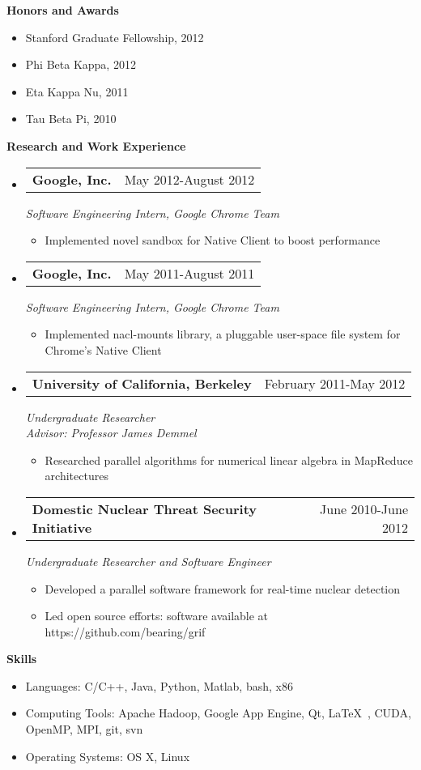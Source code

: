 \documentclass[letterpaper,11pt]{article}
\makeatletter
\newcommand{\resitem}[1]{\item #1 \vspace{-2pt}}
\newcommand{\desitem}[1]{\item #1 \vspace{-7pt}}
\newcommand{\resheading}[1]{{\large \colorbox{mygrey}{\begin{minipage}{\textwidth}{\textbf{#1 \vphantom{p\^{E}}}}\end{minipage}}}}
\newcommand{\expsubheading}[3]{
\begin{tabular*}{7.0in}{l@{\extracolsep{\fill}}r}
		\textbf{#1} & #2 \\
\end{tabular*}
\emph{#3}
\vspace{-6pt}
}
\makeatother
\begin{document}
\resheading{Honors and Awards}
\begin{itemize}
	\desitem{Stanford Graduate Fellowship, 2012}
	\desitem{Phi Beta Kappa, 2012}
	\desitem{Eta Kappa Nu, 2011}
	\desitem{Tau Beta Pi, 2010}
\end{itemize}

\vspace{0.1in}

\resheading{Research and Work Experience}
\begin{itemize}
\item
     \expsubheading{Google, Inc.}{May 2012-August 2012}{Software Engineering Intern, Google Chrome Team}
     \begin{itemize}
         \resitem{Implemented novel sandbox for Native Client to boost performance}
     \end{itemize}
     
     \item
     \expsubheading{Google, Inc.}{May 2011-August 2011}{Software Engineering Intern, Google Chrome Team}
     \begin{itemize}
         \resitem{Implemented nacl-mounts library, a pluggable user-space file system for Chrome's Native Client}
     \end{itemize}

\item
   \expsubheading{University of California, Berkeley}{February 2011-May 2012}{Undergraduate Researcher \\
   Advisor: Professor James Demmel}
    \begin{itemize}
             \resitem{Researched parallel algorithms for numerical linear algebra in MapReduce architectures}
     \end{itemize}
     
\item
    \expsubheading{Domestic Nuclear Threat Security Initiative}{June 2010-June 2012}{Undergraduate Researcher and Software Engineer}
    \begin{itemize}
         \resitem{Developed a parallel software framework for real-time nuclear detection}
         \resitem{Led open source efforts: software available at https://github.com/bearing/grif}
     \end{itemize}    
     
\end{itemize}

\vspace{0.1in}

\resheading{Skills}
\begin{itemize}
    \desitem{Languages:
                    C/C++, Java, Python, Matlab, bash, x86}
    \desitem{Computing Tools:
                     Apache Hadoop, Google App Engine, Qt, \LaTeX\ , CUDA, OpenMP, MPI, git, svn}
    \desitem{Operating Systems:
                     OS X, Linux}
\end{itemize}
\end{document}
